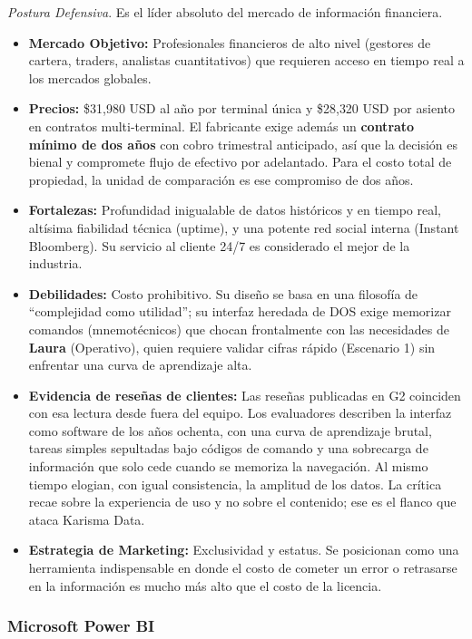 \textit{Postura Defensiva}. Es el líder absoluto del mercado de información financiera.
\begin{itemize}
    \item \textbf{Mercado Objetivo:} Profesionales financieros de alto nivel (gestores de cartera, traders, analistas cuantitativos) que requieren acceso en tiempo real a los mercados globales.
    \item \textbf{Precios:} \$31{,}980 USD al año por terminal única y \$28{,}320 USD por asiento en contratos multi-terminal. El fabricante exige además un \textbf{contrato mínimo de dos años} con cobro trimestral anticipado, así que la decisión es bienal y compromete flujo de efectivo por adelantado. Para el costo total de propiedad, la unidad de comparación es ese compromiso de dos años.
    \item \textbf{Fortalezas:} Profundidad inigualable de datos históricos y en tiempo real, altísima fiabilidad técnica (uptime), y una potente red social interna (Instant Bloomberg). Su servicio al cliente 24/7 es considerado el mejor de la industria.
    \item \textbf{Debilidades:} Costo prohibitivo. Su diseño se basa en una filosofía de ``complejidad como utilidad''; su interfaz heredada de DOS exige memorizar comandos (mnemotécnicos) que chocan frontalmente con las necesidades de \textbf{Laura} (Operativo), quien requiere validar cifras rápido (Escenario 1) sin enfrentar una curva de aprendizaje alta.
    \item \textbf{Evidencia de reseñas de clientes:} Las reseñas publicadas en G2 coinciden con esa lectura desde fuera del equipo. Los evaluadores describen la interfaz como software de los años ochenta, con una curva de aprendizaje brutal, tareas simples sepultadas bajo códigos de comando y una sobrecarga de información que solo cede cuando se memoriza la navegación. Al mismo tiempo elogian, con igual consistencia, la amplitud de los datos. La crítica recae sobre la experiencia de uso y no sobre el contenido; ese es el flanco que ataca Karisma Data.
    \item \textbf{Estrategia de Marketing:} Exclusividad y estatus. Se posicionan como una herramienta indispensable en donde el costo de cometer un error o retrasarse en la información es mucho más alto que el costo de la licencia.
\end{itemize}

\clearpage
\subsubsection{Microsoft Power BI}

